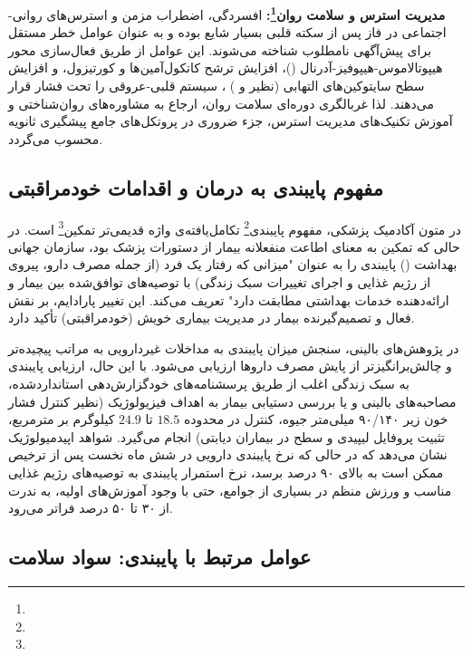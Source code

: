 \textbf{مدیریت استرس و سلامت روان\footnote{}:} افسردگی، اضطراب مزمن و استرس‌های روانی-اجتماعی در فاز پس از سکته قلبی بسیار شایع بوده و به عنوان عوامل خطر مستقل برای پیش‌آگهی نامطلوب شناخته می‌شوند. این عوامل از طریق فعال‌سازی محور هیپوتالاموس-هیپوفیز-آدرنال ()، افزایش ترشح کاتکول‌آمین‌ها و کورتیزول، و افزایش سطح سایتوکین‌های ‌التهابی (نظیر  و ) ، سیستم قلبی-عروقی را تحت فشار قرار می‌دهند\cite{Vaccarino2020Depression}. لذا غربالگری دوره‌ای سلامت روان، ارجاع به مشاوره‌های روان‌شناختی و آموزش تکنیک‌های مدیریت استرس، جزء ضروری در پروتکل‌های جامع پیشگیری ثانویه محسوب می‌گردد\cite{Vaccarino2020Depression}.

\subsection{مفهوم پایبندی به درمان و اقدامات خودمراقبتی}

در متون آکادمیک پزشکی، مفهوم پایبندی\footnote{} تکامل‌یافته‌ی واژه قدیمی‌تر تمکین\footnote{} است. در حالی که تمکین به معنای اطاعت منفعلانه بیمار از دستورات پزشک بود، سازمان جهانی بهداشت () پایبندی را به عنوان "میزانی که رفتار یک فرد (از جمله مصرف دارو، پیروی از رژیم غذایی و اجرای تغییرات سبک زندگی) با توصیه‌های توافق‌شده بین بیمار و ارائه‌دهنده خدمات بهداشتی مطابقت دارد" تعریف می‌کند\cite{Chaudri2004AdherenceWHO}. این تغییر پارادایم، بر نقش فعال و تصمیم‌گیرنده بیمار در مدیریت بیماری خویش (خودمراقبتی) تأکید دارد.

در پژوهش‌های بالینی، سنجش میزان پایبندی به مداخلات غیردارویی به مراتب پیچیده‌تر و چالش‌برانگیزتر از پایش مصرف داروها ارزیابی می‌شود. با این حال، ارزیابی پایبندی به سبک زندگی اغلب از طریق پرسشنامه‌های خودگزارش‌دهی استانداردشده، مصاحبه‌های بالینی و یا بررسی دستیابی بیمار به اهداف فیزیولوژیک (نظیر کنترل فشار خون زیر ۹۰/۱۴۰ میلی‌متر جیوه، کنترل  در محدوده $18.5$ تا $24.9$ کیلوگرم بر مترمربع، تثبیت پروفایل لیپیدی و سطح  در بیماران دیابتی) انجام می‌گیرد\cite{Kotseva2019EUROASPIRE,Chaudri2004AdherenceWHO}. شواهد اپیدمیولوژیک نشان می‌دهد که در حالی که نرخ پایبندی دارویی در شش ماه نخست پس از ترخیص ممکن است به بالای ۹۰ درصد برسد، نرخ استمرار پایبندی به توصیه‌های رژیم غذایی مناسب و ورزش منظم در بسیاری از جوامع، حتی با وجود آموزش‌های اولیه، به ندرت از ۳۰ تا ۵۰ درصد فراتر می‌رود\cite{He2026CardiacRehab}.

\subsection{عوامل مرتبط با پایبندی: سواد سلامت}

